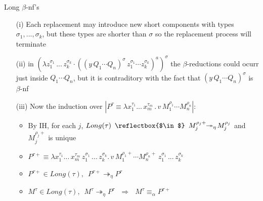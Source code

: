 \begin{frame}{Long $\beta$-nf's}
 \begin{itemize}
  \item[(i)] Each replacement may introduce new short components with types $\sigma_1, ..., \sigma_k$, but these types are shorter than $\sigma$ so
   the replacement process will terminate\\[0.3cm]
  \item[(ii)] in $(\lambda z_1^{\sigma_1}\,...\, z_k^{\sigma_k} \cdot ((y\,Q_1\cdots Q_n)^{\sigma}\, z_1^{\sigma_1}\cdots z_k^{\sigma_k})^a)^{\sigma}$ the 
              $\beta$-reductions could ocurr just inside $Q_1\cdots Q_n$, but it is contraditory with the fact that $(y\,Q_1\cdots Q_n)^{\sigma}$ is $\beta$-nf\\[0.3cm]
  \item[(iii)] Now the induction over $|P^{\tau} \equiv \lambda x_1^{\tau_1} ... \,x_m^{\tau_m} \, . \, v\, M^{\rho_1}_1 \cdots M^{\rho_n}_n|$:\\[0.2 cm]
     \begin{itemize}
      \item By IH, for each $j$, $Long(\tau)\,\,\, \mbox{\reflectbox{$\in$}} \,\,\,M_j^{\rho_j +} \!\! \twoheadrightarrow_{\eta} \!M_j^{\rho_j}$ and $M_j^{\rho_j +}$ is unique\\[0.3 cm]
      \item $P^{\tau +} \equiv \lambda x_1^{\tau_1} ... \,x_m^{\tau_m} \, z_1^{\sigma_1}\,...\, z_k^{\sigma_k} . \, v\, M^{\rho_1 +}_1 \cdots M^{\rho_n +}_n \, z_1^{\sigma_1}\,...\, z_k^{\sigma_k}$\\[0.3 cm]
      \item $P^{\tau +} \in Long(\tau), \,\,\, P^{\tau +}\twoheadrightarrow_{\eta} P^{\tau}$\\[0.3 cm]
      \item $M^{\tau} \in Long(\tau), \,\,\, M^{\tau}\twoheadrightarrow_{\eta} P^{\tau} \,\,\,\,\Longrightarrow \,\,\,\,M^{\tau} \equiv_{\alpha} P^{\tau +}$\\
     \end{itemize}
 \end{itemize}

\end{frame}



